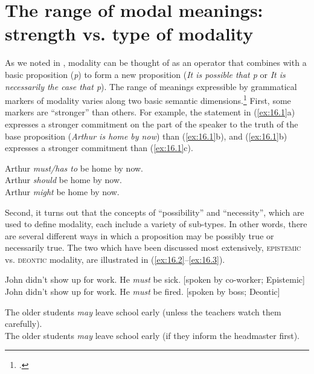 \section{The range of modal meanings: strength vs. type of modality}\label{sec:16.2}

As we noted in , modality can be thought of as an operator that combines with a basic proposition (\textit{p}) to form a new proposition (\textit{It is possible that p} or \textit{It is necessarily the case that p}). The range of meanings expressible by grammatical markers of modality varies along two basic semantic dimensions.\footnote{\citet{Hacquard2011}.} First, some markers are “stronger” than others. For example, the statement in (\ref{ex:16.1}a) expresses a stronger commitment on the part of the speaker to the truth of the base proposition (\textit{Arthur is home by now}) than (\ref{ex:16.1}b), and (\ref{ex:16.1}b) expresses a stronger commitment than (\ref{ex:16.1}c).


\ea \label{ex:16.1}
\ea  Arthur \textit{must/has to} be home by now.\\
\ex Arthur \textit{should} be home by now.\\
\ex Arthur \textit{might} be home by now.
                       \z
\z


Second, it turns out that the concepts of “possibility” and “necessity”, which are used to define modality, each include a variety of sub-types. In other words, there are several different ways in which a proposition may be possibly true or necessarily true. The two which have been discussed most extensively, \textsc{epistemic} vs. \textsc{deontic} modality, are illustrated in (\ref{ex:16.2}--\ref{ex:16.3}).


\ea \label{ex:16.2}
\ea  John didn’t show up for work. He \textit{must} be sick. \hfill [spoken by co-worker; Epistemic]\\
\ex John didn’t show up for work. He \textit{must} be fired.               \hfill [spoken by boss; Deontic]
                       \z
\z

\ea \label{ex:16.3}
\ea  The older students \textit{may} leave school early (unless the teachers watch them carefully).\\
\ex The older students \textit{may} leave school early (if they inform the headmaster first).
                       \z
\z


